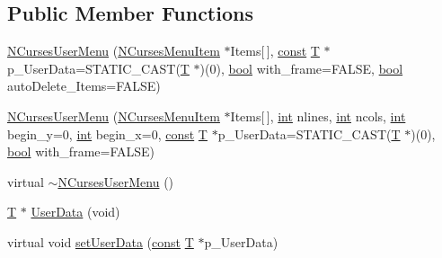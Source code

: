 \subsection*{Public Member Functions}
\begin{DoxyCompactItemize}
\item 
\hyperlink{class_n_curses_user_menu_a2056c498631311d089d2a786ec388c76}{N\-Curses\-User\-Menu} (\hyperlink{class_n_curses_menu_item}{N\-Curses\-Menu\-Item} $\ast$Items\mbox{[}$\,$\mbox{]}, \hyperlink{term__entry_8h_a57bd63ce7f9a353488880e3de6692d5a}{const} \hyperlink{curses_8priv_8h_a5ef253115820acf7d27f3c5c3b02a0f0}{T} $\ast$p\-\_\-\-User\-Data=S\-T\-A\-T\-I\-C\-\_\-\-C\-A\-S\-T(\hyperlink{curses_8priv_8h_a5ef253115820acf7d27f3c5c3b02a0f0}{T} $\ast$)(0), \hyperlink{term__entry_8h_a002004ba5d663f149f6c38064926abac}{bool} with\-\_\-frame=F\-A\-L\-S\-E, \hyperlink{term__entry_8h_a002004ba5d663f149f6c38064926abac}{bool} auto\-Delete\-\_\-\-Items=F\-A\-L\-S\-E)
\item 
\hyperlink{class_n_curses_user_menu_a2d4cd94a0d1dce8e0c0f91d1235b57f3}{N\-Curses\-User\-Menu} (\hyperlink{class_n_curses_menu_item}{N\-Curses\-Menu\-Item} $\ast$Items\mbox{[}$\,$\mbox{]}, \hyperlink{term__entry_8h_ad65b480f8c8270356b45a9890f6499ae}{int} nlines, \hyperlink{term__entry_8h_ad65b480f8c8270356b45a9890f6499ae}{int} ncols, \hyperlink{term__entry_8h_ad65b480f8c8270356b45a9890f6499ae}{int} begin\-\_\-y=0, \hyperlink{term__entry_8h_ad65b480f8c8270356b45a9890f6499ae}{int} begin\-\_\-x=0, \hyperlink{term__entry_8h_a57bd63ce7f9a353488880e3de6692d5a}{const} \hyperlink{curses_8priv_8h_a5ef253115820acf7d27f3c5c3b02a0f0}{T} $\ast$p\-\_\-\-User\-Data=S\-T\-A\-T\-I\-C\-\_\-\-C\-A\-S\-T(\hyperlink{curses_8priv_8h_a5ef253115820acf7d27f3c5c3b02a0f0}{T} $\ast$)(0), \hyperlink{term__entry_8h_a002004ba5d663f149f6c38064926abac}{bool} with\-\_\-frame=F\-A\-L\-S\-E)
\item 
virtual \hyperlink{class_n_curses_user_menu_a35aca6438e682c4e45099df3ed4771b7}{$\sim$\-N\-Curses\-User\-Menu} ()
\item 
\hyperlink{curses_8priv_8h_a5ef253115820acf7d27f3c5c3b02a0f0}{T} $\ast$ \hyperlink{class_n_curses_user_menu_a8e89ca0bec78f3213c4b81b0038576e8}{User\-Data} (void)
\item 
virtual void \hyperlink{class_n_curses_user_menu_ae67441f6c7915ea108ea7e3706724740}{set\-User\-Data} (\hyperlink{term__entry_8h_a57bd63ce7f9a353488880e3de6692d5a}{const} \hyperlink{curses_8priv_8h_a5ef253115820acf7d27f3c5c3b02a0f0}{T} $\ast$p\-\_\-\-User\-Data)
\end{DoxyCompactItemize}
